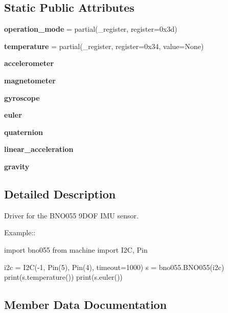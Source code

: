\subsection*{Static Public Attributes}
\begin{DoxyCompactItemize}
\item 
\mbox{\label{classbno055_1_1BNO055_a76929e934cbc21e2919b93d9426681c8}} 
{\bfseries operation\+\_\+mode} = partial(\+\_\+register, register=0x3d)
\item 
\mbox{\label{classbno055_1_1BNO055_af572b95d061a9ae02f3835c9ea8f46ef}} 
{\bfseries temperature} = partial(\+\_\+register, register=0x34, value=\+None)
\item 
{\bfseries accelerometer}
\item 
{\bfseries magnetometer}
\item 
{\bfseries gyroscope}
\item 
{\bfseries euler}
\item 
{\bfseries quaternion}
\item 
{\bfseries linear\+\_\+acceleration}
\item 
{\bfseries gravity}
\end{DoxyCompactItemize}


\subsection{Detailed Description}
\begin{DoxyVerb}Driver for the BNO055 9DOF IMU sensor.

Example::

    import bno055
    from machine import I2C, Pin

    i2c = I2C(-1, Pin(5), Pin(4), timeout=1000)
    s = bno055.BNO055(i2c)
    print(s.temperature())
    print(s.euler())
\end{DoxyVerb}
 

\subsection{Member Data Documentation}
\mbox{\label{classbno055_1_1BNO055_a91301b0009c2b20466a449fb6dd8c4e7}} 
